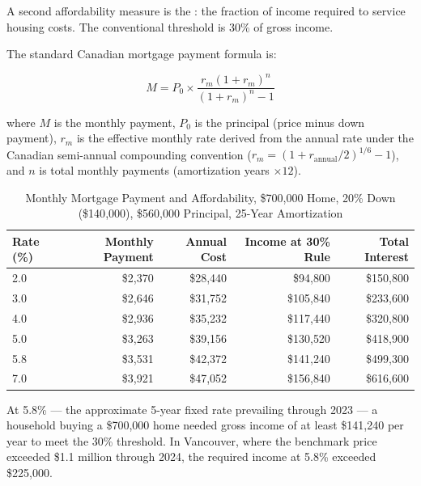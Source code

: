 A second affordability measure is the : the fraction
of income required to service housing costs. The conventional threshold is
30\% of gross income.

The standard Canadian mortgage payment formula is:

\begin{equation}
  M = P_0 \times \frac{r_m (1 + r_m)^n}{(1 + r_m)^n - 1}
  \label{eq:mortgage_payment}
\end{equation}

\noindent where $M$ is the monthly payment, $P_0$ is the principal (price
minus down payment), $r_m$ is the effective monthly rate derived from the
annual rate under the Canadian semi-annual compounding convention
($r_m = (1 + r_{\text{annual}}/2)^{1/6} - 1$), and $n$ is total monthly
payments (amortization years $\times 12$).

\begin{table}[H]
\centering
\caption{Monthly Mortgage Payment and Affordability, \$700{,}000 Home,
20\% Down (\$140{,}000), \$560{,}000 Principal, 25-Year Amortization}
\label{tab:mortgage_payments}
\renewcommand{\arraystretch}{1.35}
\begin{tabular}{lrrrr}
\toprule
\textbf{Rate (\%)} & \textbf{Monthly Payment} & \textbf{Annual Cost}
                   & \textbf{Income at 30\% Rule} & \textbf{Total Interest} \\
\midrule
2.0 & \$2{,}370 & \$28{,}440 & \$94{,}800  & \$150{,}800 \\
3.0 & \$2{,}646 & \$31{,}752 & \$105{,}840 & \$233{,}600 \\
4.0 & \$2{,}936 & \$35{,}232 & \$117{,}440 & \$320{,}800 \\
5.0 & \$3{,}263 & \$39{,}156 & \$130{,}520 & \$418{,}900 \\
5.8 & \$3{,}531 & \$42{,}372 & \$141{,}240 & \$499{,}300 \\
7.0 & \$3{,}921 & \$47{,}052 & \$156{,}840 & \$616{,}600 \\
\bottomrule
\end{tabular}
\end{table}

At 5.8\% --- the approximate 5-year fixed rate prevailing through 2023 ---
a household buying a \$700{,}000 home needed gross income of at least
\$141{,}240 per year to meet the 30\% threshold. In Vancouver, where the
benchmark price exceeded \$1.1 million through 2024, the required income
at 5.8\% exceeded \$225{,}000.

